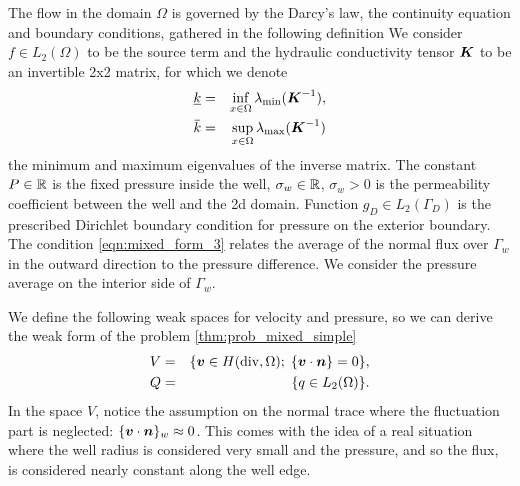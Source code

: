 The flow in the domain $\Omega$ is governed by the Darcy's law, the continuity equation and
boundary conditions, gathered in the following definition
We consider $f\in L_2(\Omega)$ to be the source term and the hydraulic conductivity tensor $\mathbf{\boldsymbol{K}}$ to be an invertible 2x2 matrix,
for which we denote
\begin{eqnarray}
    \underline{k} &=& \inf\limits_{x\in\Omega}\lambda_{\min}(\vc K^{-1}),\\
    \overbar{k} &=& \sup\limits_{x\in\Omega}\lambda_{\max}(\vc K^{-1})
\end{eqnarray}
the minimum and maximum eigenvalues of the inverse matrix.
The constant $P\in\mathbb{R}$ is the fixed pressure inside the well, $\sigma_w\in\mathbb{R}$, $\sigma_w>0$ is the
permeability coefficient between the well and the 2d domain. Function $g_D\in L_2(\Gamma_D)$ is the 
prescribed Dirichlet boundary condition for pressure on the exterior boundary.
The condition \eqref{eqn:mixed_form_3} relates the average of the normal flux over $\Gamma_w$ in the outward direction
to the pressure difference. We consider the pressure average on the interior side of $\Gamma_w$.

We define the following weak spaces for velocity and pressure,
so we can derive the weak form of the problem \eqref{thm:prob_mixed_simple}
\begin{eqnarray}    
    V &=& \{\vc v\in H(\div,\Omega);\; \fluct{\vc v\cdot\vc n} = 0\}, \label{eqn:space_V}\\
    Q &=& \{q \in L_2(\Omega) %
          \}. \label{eqn:space_Q}
\end{eqnarray}
In the space $V$, notice the assumption on the normal trace where the fluctuation part is neglected: $\{\mathbf{\boldsymbol{v}}\cdot \mathbf{\boldsymbol{n}}\}_w \approx 0$.
This comes with the idea of a real situation where the well radius is considered very small and the pressure, and so the flux,
is considered nearly constant along the well edge.

